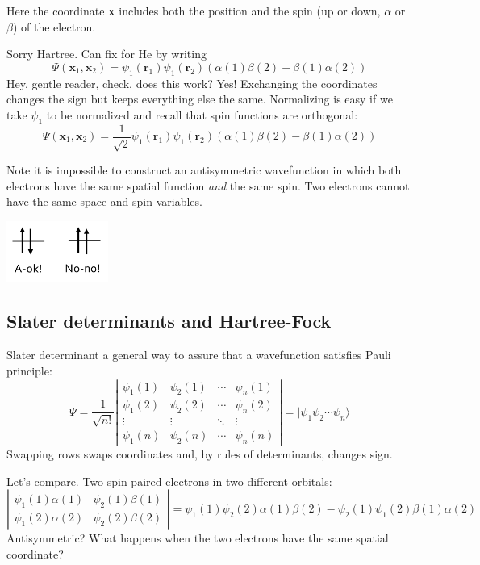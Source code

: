 \documentclass[11pt]{article}
\begin{document}
Here the coordinate \textbf{x} includes both the position and the spin (up or down, \(\alpha\) or \(\beta\)) of the electron.

Sorry Hartree.  Can fix for He by writing 
\[\Psi(\bm{x}_1,\bm{x}_2) = \psi_1(\bm{r}_1)\psi_1(\bm{r}_2)\left(\alpha(1)\beta(2) - \beta(1)\alpha(2)\right) \]
Hey, gentle reader, check, does this work?  Yes! Exchanging the coordinates changes the sign but keeps everything else the same.  Normalizing is easy if we take \(\psi_1\) to be normalized and recall that spin functions are orthogonal:
\[\Psi(\bm{x}_1,\bm{x}_2) = \frac{1}{\sqrt{2}}\psi_1(\bm{r}_1)\psi_1(\bm{r}_2)\left(\alpha(1)\beta(2) - \beta(1)\alpha(2)\right) \]

Note it is impossible to construct an antisymmetric wavefunction in which both electrons have the same spatial function \emph{and} the same spin.  Two electrons cannot have the same space and spin variables.
\begin{center}
\begin{center}
\includegraphics[width=0.25\textwidth]{./Images/Pauli.png}
\end{center}
\end{center}

\subsection{Slater determinants and Hartree-Fock}
\label{sec:org2758f27}
Slater determinant a general way to assure that a wavefunction satisfies Pauli principle:
\[ \Psi = \frac{1}{\sqrt{n!}}\left | \begin{array}{cccc}
\psi_1(1) & \psi_2(1) & \cdots & \psi_n(1) \\
\psi_1(2) & \psi_2(2) & \cdots & \psi_n(2) \\
\vdots & \vdots & \ddots & \vdots \\
\psi_1(n) & \psi_2(n) & \cdots & \psi_n(n) \end{array} \right | = |\psi_1\psi_2\cdots\psi_n\rangle \]
Swapping rows swaps coordinates and, by rules of determinants, changes sign.

Let's compare.  Two spin-paired electrons in two different orbitals:
\[ \left | \begin{array}{cc}
\psi_1(1)\alpha(1) & \psi_2(1) \beta(1) \\
\psi_1(2)\alpha(2) & \psi_2(2) \beta(2)\end{array} \right |
 = \psi_1(1)\psi_2(2)\alpha(1)\beta(2)-\psi_2(1)\psi_1(2)\beta(1)\alpha(2) \]
Antisymmetric?  What happens when the two electrons have the same spatial coordinate?
\end{document}
